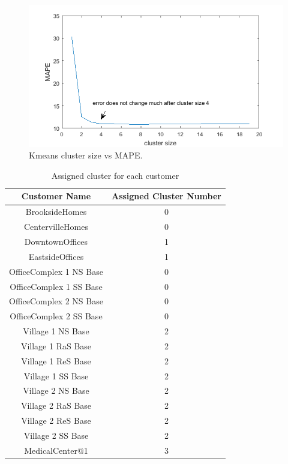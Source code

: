 \begin{figure}[h!]
  \includegraphics{cluster-error.png}
  \caption{Kmeans cluster size vs MAPE. }
  \label{fig:cluster-error}
\end{figure}

\begin{table}[h!]
\centering
\caption{Assigned cluster for each customer}
\begin{tabular}{|c| c|} 
 \hline
 Customer Name & Assigned Cluster Number \\ [0.5ex] 
 \hline
BrooksideHomes &	0 \\
CentervilleHomes & 0 \\
DowntownOffices & 1	\\
EastsideOffices &	1 \\
OfficeComplex 1 NS Base &	0 \\
OfficeComplex 1 SS Base &	0 \\
OfficeComplex 2 NS Base &	0 \\
OfficeComplex 2 SS Base &	0 \\
Village 1 NS Base &	2 \\
Village 1 RaS Base &	2 \\
Village 1 ReS Base &	2 \\
Village 1 SS Base &	2 \\
Village 2 NS Base &	2 \\
Village 2 RaS Base &	2 \\
Village 2 ReS Base &	2 \\
Village 2 SS Base &	2 \\
MedicalCenter@1	& 3 \\ [1ex] 
 \hline
\end{tabular}
\label{table:clusterAss}
\end{table}

